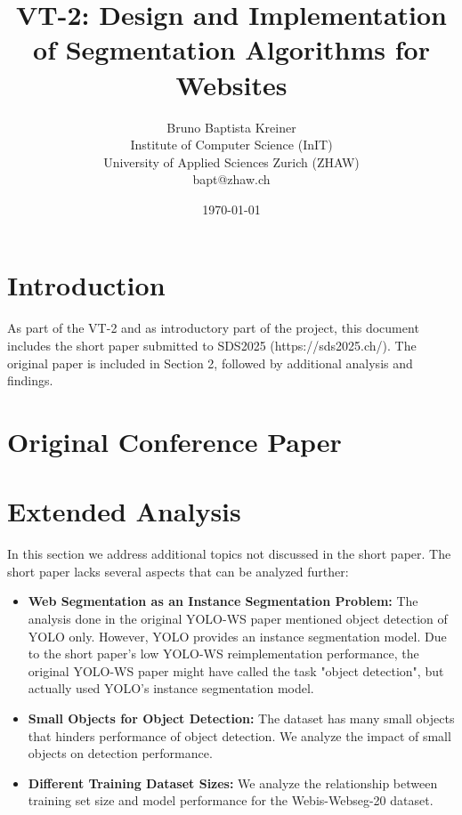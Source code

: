 \documentclass{article}  %
\begin{document}
\title{\Large VT-2: Design and Implementation of Segmentation Algorithms for Websites}
\author{Bruno Baptista Kreiner\\
Institute of Computer Science (InIT) \\
University of Applied Sciences Zurich (ZHAW) \\
bapt@zhaw.ch}
\date{\today}

\maketitle

\section{Introduction}
As part of the VT-2 and as introductory part of the project, this document includes the short paper submitted to SDS2025 (https://sds2025.ch/). The original paper is included in Section 2, followed by additional analysis and findings.

\section{Original Conference Paper}


\section{Extended Analysis}
In this section we address additional topics not discussed in the short paper. The short paper lacks several aspects that can be analyzed further:

\begin{itemize}
\item \textbf{Web Segmentation as an Instance Segmentation Problem:} The analysis done in the original YOLO-WS paper mentioned object detection of YOLO only. However, YOLO provides an instance segmentation model. Due to the short paper's low YOLO-WS reimplementation performance, the original YOLO-WS paper might have called the task "object detection", but actually used YOLO's instance segmentation model. 
\item \textbf{Small Objects for Object Detection:} The dataset has many small objects that hinders performance of object detection. We analyze the impact of small objects on detection performance.
\item \textbf{Different Training Dataset Sizes:} We analyze the relationship between training set size and model performance for the Webis-Webseg-20 dataset.
\end{itemize}
\end{document}
